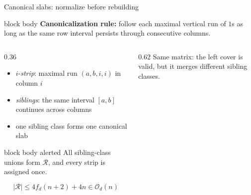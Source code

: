 \documentclass[aspectratio=169,11pt]{beamer}
\renewcommand{\leq}{\leqslant}
\newcommand{\Oh}{\mathcal{O}}
\newcommand{\fillslab}[6]{\fill[#1,opacity=0.66] ({#4-1},{#6-#3}) rectangle ({#5},{#6+1-#2});}
\begin{document}
\begin{frame}{Canonical slabs: normalize before rebuilding}
\vspace{-0.25em}
\begin{beamercolorbox}[wd=\textwidth,sep=0.65ex,rounded=true]{block body}
\small \textbf{Canonicalization rule:} follow each maximal vertical run of $1$s as long as the same row interval persists through consecutive columns.
\end{beamercolorbox}

\vspace{-0.15em}
\begin{columns}[T,onlytextwidth]
\begin{column}{0.36\textwidth}
{\footnotesize
\begin{itemize}
\setlength\itemsep{0.16em}
\item $i$-\emph{strip}: maximal run $(a,b,i,i)$ in column $i$
\item \emph{siblings}: the same interval $[a,b]$ continues across columns
\item one sibling class forms one canonical slab
\end{itemize}
}

\begin{beamercolorbox}[wd=\linewidth,sep=0.65ex,rounded=true]{block body alerted}
\footnotesize All sibling-class unions form $\mathcal{R}$, and every strip is assigned once.
\end{beamercolorbox}

\vspace{-0.15em}
{\footnotesize
\[
|\mathcal{R}| \leq 4f_d(n+2)+4n \in \Oh_d(n)
\]
}
\end{column}

\begin{column}{0.62\textwidth}
\centering
{\scriptsize Same matrix: the left cover is valid, but it merges different sibling classes.}

\vspace{-0.15em}
\end{column}
\end{columns}
\end{frame}
\end{document}
